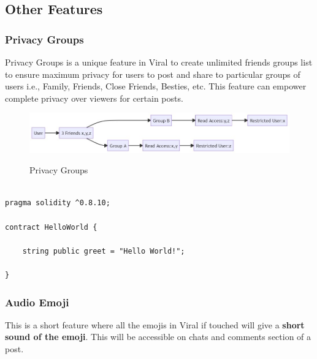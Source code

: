 \documentclass[10pt]{article}
\begin{document}
\subsection{Other Features}

\subsubsection{Privacy Groups}

Privacy Groups is a unique feature in Viral to create unlimited friend\textsc{}s groups list to ensure maximum privacy for users to post and share to particular groups of users i.e., Family, Friends, Close Friends, Besties, etc. This feature can empower complete privacy over viewers for certain posts.\\

\begin{figure}[H]
\includegraphics[width=\textwidth]{privacygroups}\\
\caption{Privacy Groups}
\end{figure}

\begin{lstlisting}[language=Solidity, caption={GunDB Privacy Group Snippet}]

pragma solidity ^0.8.10;

contract HelloWorld {

    string public greet = "Hello World!";
    
}
\end{lstlisting}

\subsubsection{Audio Emoji}

This is a short feature where all the emojis in Viral if touched will give a \textbf{short sound of the emoji}. This will be accessible on chats and comments section of a post.\\
\end{document}
